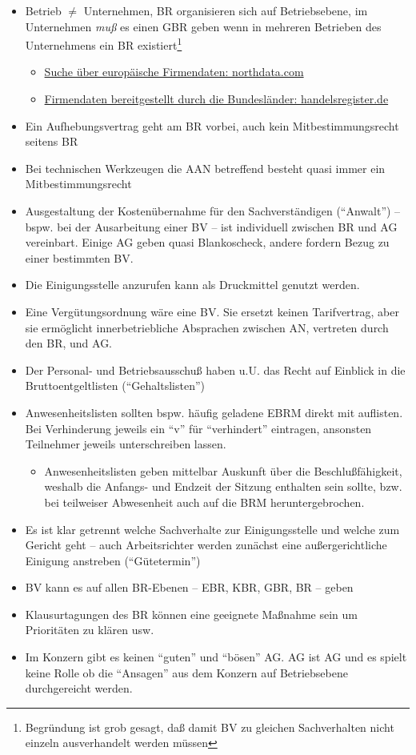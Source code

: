 \documentclass[version=last,paper=A4,fontsize=11pt,DIV=18]{scrartcl}
\begin{document}
\begin{itemize}
\begin{itemize}
	\end{itemize}
	\item Betrieb $\neq$ Unternehmen, BR organisieren sich auf Betriebsebene, im Unternehmen \emph{muß} es einen GBR geben wenn in mehreren Betrieben des Unternehmens ein BR existiert\footnote{Begründung ist grob gesagt, daß damit BV zu gleichen Sachverhalten nicht einzeln ausverhandelt werden müssen}
	\begin{itemize}
		\item \href{https://www.northdata.com}{Suche über europäische Firmendaten: northdata.com}
		\item \href{https://www.handelsregister.de}{Firmendaten bereitgestellt durch die Bundesländer: handelsregister.de}
	\end{itemize}
	\item Ein Aufhebungsvertrag geht am BR vorbei, auch kein Mitbestimmungsrecht seitens BR
	\item Bei technischen Werkzeugen die AAN betreffend besteht quasi immer ein Mitbestimmungsrecht
	\item Ausgestaltung der Kostenübernahme für den Sachverständigen (\enquote{Anwalt}) -- bspw. bei der Ausarbeitung einer BV -- ist individuell zwischen BR und AG vereinbart. Einige AG geben quasi Blankoscheck, andere fordern Bezug zu einer bestimmten BV.
	\item Die Einigungsstelle anzurufen kann als Druckmittel genutzt werden.
	\item Eine Vergütungsordnung wäre eine BV. Sie ersetzt keinen Tarifvertrag, aber sie ermöglicht innerbetriebliche Absprachen zwischen AN, vertreten durch den BR, und AG.
	\item Der Personal- und Betriebsausschuß haben u.U. das Recht auf Einblick in die Bruttoentgeltlisten (\enquote{Gehaltslisten})
	\item Anwesenheitslisten sollten bspw. häufig geladene EBRM direkt mit auflisten. Bei Verhinderung jeweils ein \enquote{v} für \enquote{verhindert} eintragen, ansonsten Teilnehmer jeweils unterschreiben lassen.
	\begin{itemize}
		\item Anwesenheitslisten geben mittelbar Auskunft über die Beschlußfähigkeit, weshalb die Anfangs- und Endzeit der Sitzung enthalten sein sollte, bzw. bei teilweiser Abwesenheit auch auf die BRM heruntergebrochen.
	\end{itemize}
	\item Es ist klar getrennt welche Sachverhalte zur Einigungsstelle und welche zum Gericht geht -- auch Arbeitsrichter werden zunächst eine außergerichtliche Einigung anstreben (\enquote{Gütetermin})
	\item BV kann es auf allen BR-Ebenen -- EBR, KBR, GBR, BR -- geben
	\item Klausurtagungen des BR können eine geeignete Maßnahme sein um Prioritäten zu klären usw.
	\item Im Konzern gibt es keinen \enquote{guten} und \enquote{bösen} AG. AG ist AG und es spielt keine Rolle ob die \enquote{Ansagen} aus dem Konzern auf Betriebsebene durchgereicht werden.
\end{itemize}
\end{document}
